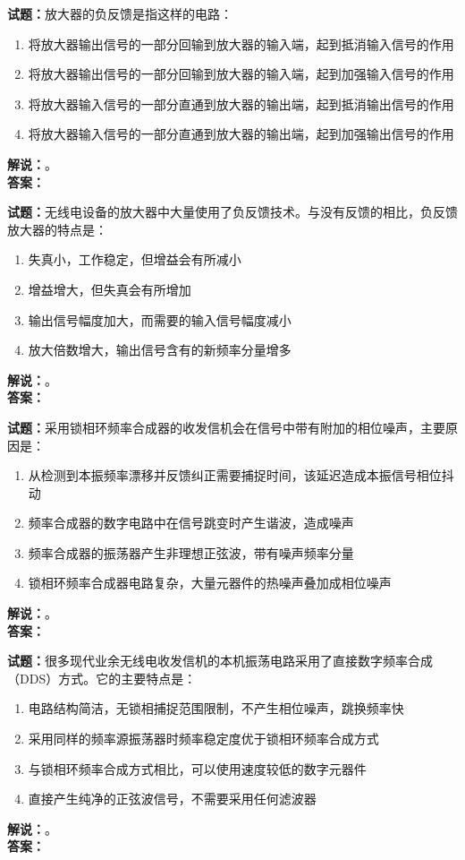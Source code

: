 \documentclass{ctexbook}
\begin{document}
\bigskip

\noindent\textbf{试题：}放大器的负反馈是指这样的电路：
\begin{enumerate}[leftmargin=3em]
  \item 将放大器输出信号的一部分回输到放大器的输入端，起到抵消输入信号的作用
  \item 将放大器输出信号的一部分回输到放大器的输入端，起到加强输入信号的作用
  \item 将放大器输入信号的一部分直通到放大器的输出端，起到抵消输出信号的作用
  \item 将放大器输入信号的一部分直通到放大器的输出端，起到加强输出信号的作用
\end{enumerate}
\noindent\textbf{解说：}\textbf{}。\\\noindent\textbf{答案：}

\bigskip

\noindent\textbf{试题：}无线电设备的放大器中大量使用了负反馈技术。与没有反馈的相比，负反馈放大器的特点是：
\begin{enumerate}[leftmargin=3em]
  \item 失真小，工作稳定，但增益会有所减小
  \item 增益增大，但失真会有所增加
  \item 输出信号幅度加大，而需要的输入信号幅度减小
  \item 放大倍数增大，输出信号含有的新频率分量增多
\end{enumerate}
\noindent\textbf{解说：}\textbf{}。\\\noindent\textbf{答案：}

\bigskip

\noindent\textbf{试题：}采用锁相环频率合成器的收发信机会在信号中带有附加的相位噪声，主要原因是：
\begin{enumerate}[leftmargin=3em]
  \item 从检测到本振频率漂移并反馈纠正需要捕捉时间，该延迟造成本振信号相位抖动
  \item 频率合成器的数字电路中在信号跳变时产生谐波，造成噪声
  \item 频率合成器的振荡器产生非理想正弦波，带有噪声频率分量
  \item 锁相环频率合成器电路复杂，大量元器件的热噪声叠加成相位噪声
\end{enumerate}
\noindent\textbf{解说：}\textbf{}。\\\noindent\textbf{答案：}

\bigskip

\noindent\textbf{试题：}很多现代业余无线电收发信机的本机振荡电路采用了直接数字频率合成（DDS）方式。它的主要特点是：
\begin{enumerate}[leftmargin=3em]
  \item 电路结构简洁，无锁相捕捉范围限制，不产生相位噪声，跳换频率快
  \item 采用同样的频率源振荡器时频率稳定度优于锁相环频率合成方式
  \item 与锁相环频率合成方式相比，可以使用速度较低的数字元器件
  \item 直接产生纯净的正弦波信号，不需要采用任何滤波器
\end{enumerate}
\noindent\textbf{解说：}\textbf{}。\\\noindent\textbf{答案：}
\end{document}

